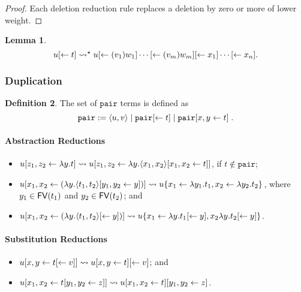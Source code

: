 \documentclass[11pt,a4paper]{article}
\theoremstyle{definition}
\newtheorem{definition}{Definition}
\theoremstyle{plain}
\newtheorem{lemma}[definition]{Lemma}
\theoremstyle{remark}
\begin{document}
\begin{proof}
Each deletion reduction rule replaces a deletion by zero or more of lower weight.
\end{proof}

\begin{lemma}
\[
u{[\leftarrow{t}]}\rightsquigarrow^\star u{[\leftarrow{(v_1)w_1}]}\cdots{[\leftarrow{(v_m)w_m}]}{[\leftarrow{x_1}]}\cdots{[\leftarrow{x_n}]}.
\]
\end{lemma}

\subsubsection{Duplication}

\newcommand{\tpair}{{\mathtt{pair}}}

\begin{definition}
	The set of $\tpair$ terms is defined as
	\[\tpair:=\terpair{u}{v}\;|\;\tpair\terdel{t}\;|\;\tpair\terdup{x}{y}{t}\;.\]
\end{definition}

\paragraph{Abstraction Reductions}

\begin{itemize}
	\item $u{[{z_1},{z_2}\leftarrow{\lambda y.t}]}\rightsquigarrow u{[{z_1},{z_2}\leftarrow{\lambda y.{\langle{x_1},{x_2}\rangle}{[{x_1},{x_2}\leftarrow{t}]}}]}$, if $t\not\in\tpair$;
	\item $u{[{x_1},{x_2}\leftarrow{(\lambda y.{\langle{t_1},{t_2}\rangle}{[{y_1},{y_2}\leftarrow{y}]})}]}\rightsquigarrow u\{x_1\leftarrow\lambda y_1.t_1,x_2\leftarrow\lambda y_2.t_2\}$, where $y_1\in{\mathop{\mathsf{FV}}}(t_1)$ and $y_2\in{\mathop{\mathsf{FV}}}(t_2)$; and
	\item $u{[{x_1},{x_2}\leftarrow{(\lambda y.{\langle{t_1},{t_2}\rangle}{[\leftarrow{y}]})}]}\rightsquigarrow u\{x_1\leftarrow\lambda y.t_1{[\leftarrow{y}]},x_2\lambda y.t_2{[\leftarrow{y}]}\}$.
\end{itemize}

\paragraph{Substitution Reductions}

\begin{itemize}
	\item $u{[{x},{y}\leftarrow{t{[\leftarrow{v}]}}]}\rightsquigarrow u{[{x},{y}\leftarrow{t}]}{[\leftarrow{v}]}$; and
	\item $u{[{x_1},{x_2}\leftarrow{t{[{y_1},{y_2}\leftarrow{z}]}}]}\rightsquigarrow u{[{x_1},{x_2}\leftarrow{t}]}{[{y_1},{y_2}\leftarrow{z}]}$.
\end{itemize}
\end{document}
